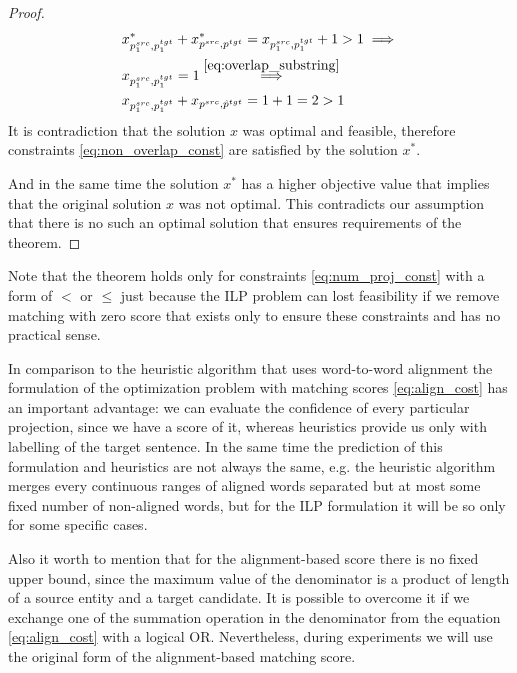 \begin{proof}
\begin{align*}
         & x^*_{p_1^{src}, p_1^{tgt}} + x^*_{p^{src}, p^{tgt}} =
        x_{p_1^{src}, p_1^{tgt}} + 1 > 1 \implies                                                                      \\
         & x_{p_1^{src}, p_1^{tgt}} = 1
        \stackrel{\eqref{eq:overlap_substring}}{\implies}                                                              \\
         & x_{p_1^{src}, p_1^{tgt}} + x_{p^{src}, \hat{p}^{tgt}} = 1 + 1 = 2 > 1
    \end{align*}
    It is contradiction that the solution \( x \) was optimal and feasible, therefore constraints \eqref{eq:non_overlap_const}
    are satisfied by the solution \( x^* \).

    And in the same time the solution \( x^* \) has a higher objective value that implies that the original solution \( x \) was not optimal.
    This contradicts our assumption that there is no such an optimal solution that ensures requirements of the theorem.
\end{proof}
Note that the theorem holds only for constraints \eqref{eq:num_proj_const} with a form of \( < \) or
\( \leq \) just because the ILP problem can lost feasibility if we remove matching with zero score that
exists only to ensure these constraints and has no practical sense.

In comparison to the heuristic algorithm that uses word-to-word alignment the formulation of the optimization
problem with matching scores \eqref{eq:align_cost} has an important advantage: we can evaluate the confidence of
every particular projection, since we have a score of it, whereas heuristics provide us only with labelling of the target
sentence. In the same time the prediction of this formulation and heuristics are not always the same, e.g.
the heuristic algorithm merges every continuous ranges of aligned words separated but at most some fixed number of non-aligned words,
but for the ILP formulation it will be so only for some specific cases.

Also it worth to mention that for the alignment-based score there is no fixed upper bound, since
the maximum value of the denominator is a product of length of a source entity and a target candidate.
It is possible to overcome it if we exchange one of the summation operation in the denominator from the
equation \eqref{eq:align_cost} with a logical OR. Nevertheless, during experiments we will use the
original form of the alignment-based matching score.

